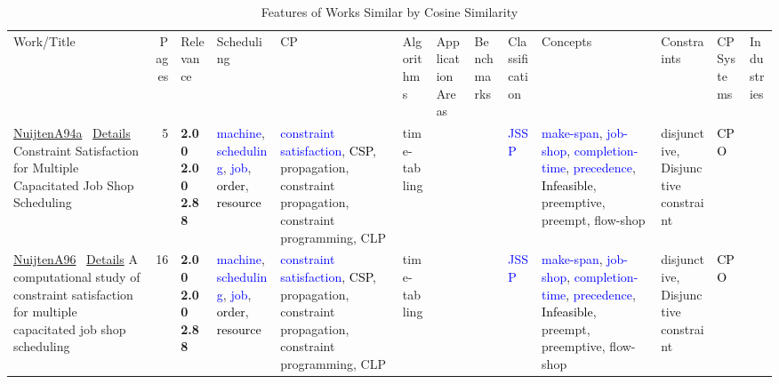 {\scriptsize
\begin{longtable}{>{\raggedright\arraybackslash}p{3cm}r>{\raggedright\arraybackslash}p{1.0cm}>{\raggedright\arraybackslash}p{ 1.50cm}>{\raggedright\arraybackslash}p{ 1.50cm}>{\raggedright\arraybackslash}p{ 1.50cm}>{\raggedright\arraybackslash}p{ 1.50cm}>{\raggedright\arraybackslash}p{ 1.50cm}>{\raggedright\arraybackslash}p{ 1.50cm}>{\raggedright\arraybackslash}p{ 1.50cm}>{\raggedright\arraybackslash}p{ 1.50cm}>{\raggedright\arraybackslash}p{ 1.50cm}>{\raggedright\arraybackslash}p{ 1.50cm}}
\rowcolor{white}\caption{Features of Works Similar by Cosine Similarity}\\ \toprule
\rowcolor{white}Work/Title & Pages & Relevance & Scheduling& CP& Algorithms& ApplicationAreas& Benchmarks& Classification& Concepts& Constraints& CPSystems& Industries\\ \midrule\endhead
\bottomrule
\endfoot
\href{../scheduling/works/NuijtenA94a.pdf}{NuijtenA94a}~\cite{NuijtenA94a} \hyperref[detail:NuijtenA94a]{Details} Constraint Satisfaction for Multiple Capacitated Job Shop Scheduling & 5 & \noindent{}\textbf{2.00} \textbf{2.00} \textbf{2.88} & \textcolor{blue}{machine}, \textcolor{blue}{scheduling}, \textcolor{blue}{job}, \textcolor{black}{order}, \textcolor{black}{resource} & \textcolor{blue}{constraint satisfaction}, \textcolor{black}{CSP}, \textcolor{black!40}{propagation}, \textcolor{black!40}{constraint propagation}, \textcolor{black!40}{constraint programming}, \textcolor{black!40}{CLP} & \textcolor{black!40}{time-tabling} &  &  & \textcolor{blue}{JSSP} & \textcolor{blue}{make-span}, \textcolor{blue}{job-shop}, \textcolor{blue}{completion-time}, \textcolor{blue}{precedence}, \textcolor{black}{Infeasible}, \textcolor{black!40}{preemptive}, \textcolor{black!40}{preempt}, \textcolor{black!40}{flow-shop} & \textcolor{black!40}{disjunctive}, \textcolor{black!40}{Disjunctive constraint} & \textcolor{black}{CPO} & \\
\href{../scheduling/works/NuijtenA96.pdf}{NuijtenA96}~\cite{NuijtenA96} \hyperref[detail:NuijtenA96]{Details} A computational study of constraint satisfaction for multiple capacitated job shop scheduling & 16 & \noindent{}\textbf{2.00} \textbf{2.00} \textbf{2.88} & \textcolor{blue}{machine}, \textcolor{blue}{scheduling}, \textcolor{blue}{job}, \textcolor{black}{order}, \textcolor{black}{resource} & \textcolor{blue}{constraint satisfaction}, \textcolor{black}{CSP}, \textcolor{black!40}{propagation}, \textcolor{black!40}{constraint propagation}, \textcolor{black!40}{constraint programming}, \textcolor{black!40}{CLP} & \textcolor{black!40}{time-tabling} &  &  & \textcolor{blue}{JSSP} & \textcolor{blue}{make-span}, \textcolor{blue}{job-shop}, \textcolor{blue}{completion-time}, \textcolor{blue}{precedence}, \textcolor{black}{Infeasible}, \textcolor{black!40}{preempt}, \textcolor{black!40}{preemptive}, \textcolor{black!40}{flow-shop} & \textcolor{black!40}{disjunctive}, \textcolor{black!40}{Disjunctive constraint} & \textcolor{black}{CPO} & \\

\end{longtable}}
